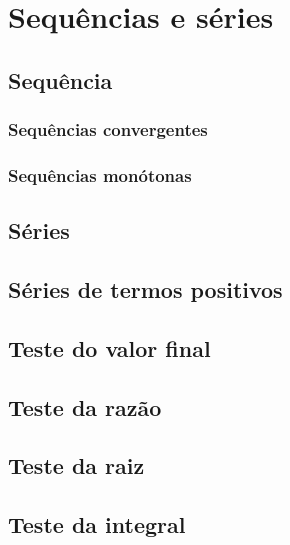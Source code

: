 
\chapter{Sequências e séries}\label{cap:seq_series}

\emconstrucao

\section{Sequência}
\subsection{Sequências convergentes}
\subsection{Sequências monótonas}
\construirSec

\section{Séries}
\construirSec

\section{Séries de termos positivos}
\construirSec

\section{Teste do valor final}
\construirSec

\section{Teste da razão}
\construirSec

\section{Teste da raiz}
\construirSec

\section{Teste da integral}
\construirSec

